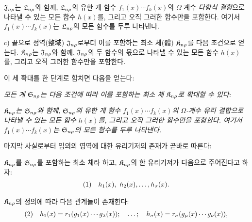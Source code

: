 $\mathfrak J_{n\rho}$는 $\mathfrak L_{n\rho}$와 함께, $\mathfrak L_{n\rho}$의 유한 개 함수 $f_1(x)\cdots f_k(x)$의 $\Omega$-계수 \emph{다항식 결합}으로 나타낼 수 있는 모든 함수 $h(x)$를, 그리고 오직 그러한 함수만을 포함한다. 여기서 $f_1(x)\cdots f_k(x)$는 $\mathfrak L_{n\rho}$의 모든 함수를 두루 나타낸다.

c) 끝으로 정역(整域) $\mathfrak J_{n\rho}$로부터 이를 포함하는 최소 체(體) $\mathfrak K_{n\rho}$를 다음 조건으로 얻는다. $\mathfrak K_{n\rho}$는 $\mathfrak J_{n\rho}$와 함께, $\mathfrak J_{n\rho}$의 두 함수의 몫으로 나타낼 수 있는 모든 함수 $h(x)$를, 그리고 오직 그러한 함수만을 포함한다.

이 세 확대를 한 단계로 합치면 다음을 얻는다:

\emph{모든 계 $\mathfrak S_{n\rho}$는 다음 조건에 따라 이를 포함하는 최소 체 $\mathfrak K_{n\rho}$로 확대할 수 있다:}

\emph{$\mathfrak K_{n\rho}$는 $\mathfrak S_{n\rho}$와 함께, $\mathfrak S_{n\rho}$의 유한 개 함수 $f_1(x)\cdots f_k(x)$의 $\Omega$-계수 유리 결합으로 나타낼 수 있는 모든 함수 $h(x)$를, 그리고 오직 그러한 함수만을 포함한다. 여기서 $f_1(x)\cdots f_k(x)$는 $\mathfrak S_{n\rho}$의 모든 함수를 두루 나타낸다.}

마지막 사실로부터 임의의 영역에 대한 유리기저의 존재가 곧바로 따른다:

$\mathfrak K_{n\rho}$를 $\mathfrak S_{n\rho}$를 포함하는 최소 체라 하고, $\mathfrak K_{n\rho}$의 한 유리기저가 다음으로 주어진다고 하자:
\[
\begin{array}{@{}l@{\quad}c@{}}
(1)&h_1(x),\ h_2(x),\ldots,h_\sigma(x).
\end{array}
\]

$\mathfrak K_{n\rho}$의 정의에 따라 다음 관계들이 존재한다:
\[
\begin{array}{@{}l@{\quad}c@{}}
(2)&h_1(x)=r_1(g_1(x)\cdots g_\lambda(x));\quad\ldots;\quad h_\sigma(x)=r_\sigma(g_\mu(x)\cdots g_\nu(x)),
\end{array}
\]


